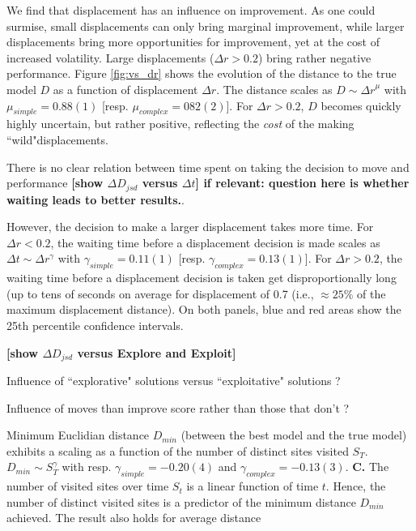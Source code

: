 We find that displacement has an influence on improvement. As one could surmise, small displacements can only bring marginal improvement, while larger displacements bring more opportunities for improvement, yet at the cost of increased volatility. Large displacements ($\Delta r > 0.2$) bring rather negative performance. Figure \ref{fig:vs_dr} shows the evolution of the distance to the true model $D$ as a function of displacement $\Delta r$. The distance scales as $D \sim {\Delta r}^{\mu}$ with $\mu_{simple} = 0.88(1)$ [resp. $\mu_{complex} = 082(2)$]. For $\Delta r > 0.2$, $D$ becomes quickly highly uncertain, but rather positive, reflecting the {\it cost} of the making ``wild"displacements. 

There is no clear relation between time spent on taking the decision to move and performance {\bf [show $\Delta D_{jsd}$ versus $\Delta t$] if relevant: question here is whether waiting leads to better results.}.

However, the decision to make a larger displacement takes more time. For $\Delta r < 0.2$, the waiting time before a displacement decision is made scales as $\Delta t \sim \Delta r^{\gamma}$ with $\gamma_{simple} = 0.11(1)$ [resp. $\gamma_{complex} = 0.13(1)$]. For $\Delta r > 0.2$, the waiting time before a displacement decision is taken get disproportionally long (up to tens of seconds on average for displacement of 0.7 (i.e., $\approx 25\%$ of the maximum displacement distance). On both panels, blue and red areas show the 25th percentile confidence intervals.


{\bf [show $\Delta D_{jsd}$ versus Explore and Exploit]}

Influence of ``explorative" solutions versus ``exploitative" solutions ?

Influence of moves than improve score rather than those that don't ?


Minimum Euclidian distance $D_{min}$ (between the best model and the true model) exhibits a scaling as a function of the number of distinct sites visited $S_{T}$. $D_{min} \sim S_{T}^{\gamma}$ with resp. $\gamma_{simple} = -0.20(4)$ and $\gamma_{complex} = - 0.13(3)$. {\bf C.} The number of visited sites over time $S_t$ is a linear function of time $t$. Hence, the number of distinct visited sites is a predictor of the minimum distance $D_{min}$ achieved. The result also holds for average distance





